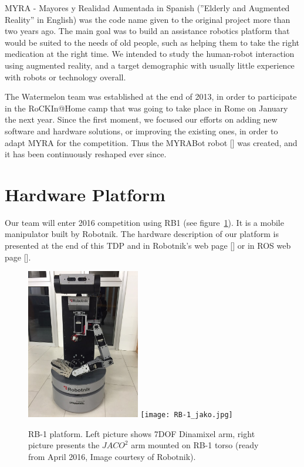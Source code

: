 \documentclass[citeauthoryear]{llncs}
\begin{document}
MYRA - Mayores y Realidad Aumentada in Spanish (''Elderly and Augmented Reality'' in English) was the code name given to the original project more than two years ago. The main goal was to build an assistance robotics platform that would be suited to the needs of old people, such as helping them to take the right medication at the right time. We intended to study the human-robot interaction using augmented reality, and a target demographic with usually little experience with robots or technology overall. 

The Watermelon team was established at the end of 2013, in order to participate in the RoCKIn@Home camp that was going to take place in Rome on January the next year. Since the first moment, we focused our efforts on adding new software and hardware solutions, or improving the existing ones, in order to adapt MYRA for the
competition. Thus the MYRABot robot [\cite{martin2014myrabot}] was created, and it has been continuously reshaped ever since.




\section{Hardware Platform}

Our team will enter 2016 competition using RB1 (see figure~\ref{fig:rb1}). It is a mobile manipulator built by Robotnik.
The hardware description of our platform is presented at the end of this TDP and in Robotnik's web page [\cite{2RobotnikRB1}] or in ROS web page [\cite{RobotnikRB1}].

\begin{figure}[ht]
  \centering
  \includegraphics[width=0.44\textwidth]{RB1_robot.jpg}
  \texttt{[image: RB-1\_jako.jpg]}
  \caption{RB-1 platform. Left picture shows 7DOF Dinamixel arm, right picture presents the $JACO^2$ arm mounted on RB-1 torso (ready from April 2016, Image courtesy of Robotnik).}
  \label{fig:rb1}
\end{figure}
\end{document}
